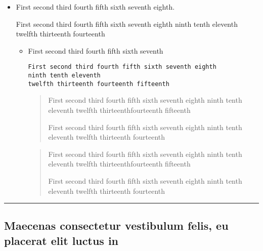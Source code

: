 \documentclass[a4paper]{book}
\begin{document}
\begin{itemize}
\item First second third fourth fifth sixth seventh eighth.

First second third fourth fifth sixth seventh eighth ninth tenth
eleventh twelfth thirteenth fourteenth
  \begin{itemize}
  \item First second third fourth fifth sixth seventh

\begin{verbatim}
First second third fourth fifth sixth seventh eighth
ninth tenth eleventh
twelfth thirteenth fourteenth fifteenth
\end{verbatim}


\begin{quote}
First second third fourth fifth sixth seventh eighth ninth tenth
eleventh twelfth thirteenthfourteenth fifteenth

First second third fourth fifth sixth seventh eighth ninth tenth
eleventh twelfth thirteenth fourteenth
\end{quote}

\begin{quotation}
First second third fourth fifth sixth seventh eighth ninth tenth
eleventh twelfth thirteenthfourteenth fifteenth

First second third fourth fifth sixth seventh eighth ninth tenth
eleventh twelfth thirteenth fourteenth
\end{quotation}

\end{itemize}
\end{itemize}

\hrule

\newpage

\subsection{Maecenas consectetur vestibulum felis, eu placerat elit
luctus in}
\end{document}
